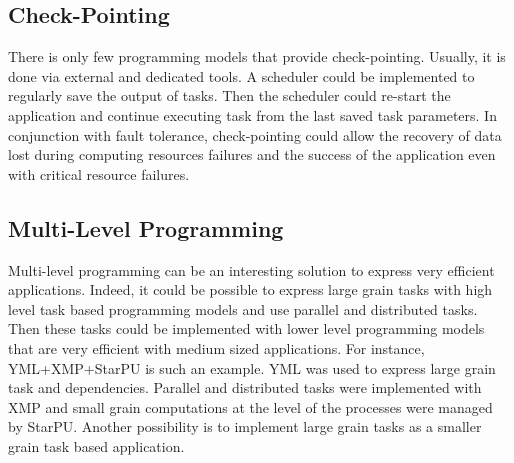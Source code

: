\subsection{Check-Pointing}
There is only few programming models that provide check-pointing.
Usually, it is done via external and dedicated tools.
A scheduler could be implemented to regularly save the output of tasks.
Then the scheduler could re-start the application and continue executing task from the last saved task parameters.
In conjunction with fault tolerance, check-pointing could allow the recovery of data lost during computing resources failures and the success of the application even with critical resource failures.

\subsection{Multi-Level Programming}
Multi-level programming can be an interesting solution to express very efficient applications.
Indeed, it could be possible to express large grain tasks with high level task based programming models and use parallel and distributed tasks.
Then these tasks could be implemented with lower level programming models that are very efficient with medium sized applications.
For instance, YML+XMP+StarPU is such an example.
YML was used to express large grain task and dependencies.
Parallel and distributed tasks were implemented with XMP and small grain computations at the level of the processes were managed by StarPU.
Another possibility is to implement large grain tasks as a smaller grain task based application.
